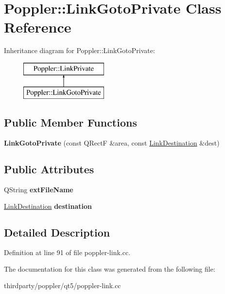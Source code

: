 \hypertarget{class_poppler_1_1_link_goto_private}{}\section{Poppler\+:\+:Link\+Goto\+Private Class Reference}
\label{class_poppler_1_1_link_goto_private}
Inheritance diagram for Poppler\+:\+:Link\+Goto\+Private\+:\begin{figure}[H]
\begin{center}
\leavevmode
\includegraphics[height=2.000000cm]{class_poppler_1_1_link_goto_private}
\end{center}
\end{figure}
\subsection*{Public Member Functions}
\begin{DoxyCompactItemize}
\item 
\mbox{\label{class_poppler_1_1_link_goto_private_ab07018547de1363af003e7a3516af7e2}} 
{\bfseries Link\+Goto\+Private} (const Q\+RectF \&area, const \hyperlink{class_poppler_1_1_link_destination}{Link\+Destination} \&dest)
\end{DoxyCompactItemize}
\subsection*{Public Attributes}
\begin{DoxyCompactItemize}
\item 
\mbox{\label{class_poppler_1_1_link_goto_private_a8e41c98f32d772c154bbae7be8dc094c}} 
Q\+String {\bfseries ext\+File\+Name}
\item 
\mbox{\label{class_poppler_1_1_link_goto_private_ab2b9ec7d767299dec1e21368f486b97c}} 
\hyperlink{class_poppler_1_1_link_destination}{Link\+Destination} {\bfseries destination}
\end{DoxyCompactItemize}


\subsection{Detailed Description}


Definition at line 91 of file poppler-\/link.\+cc.



The documentation for this class was generated from the following file\+:\begin{DoxyCompactItemize}
\item 
thirdparty/poppler/qt5/poppler-\/link.\+cc\end{DoxyCompactItemize}
